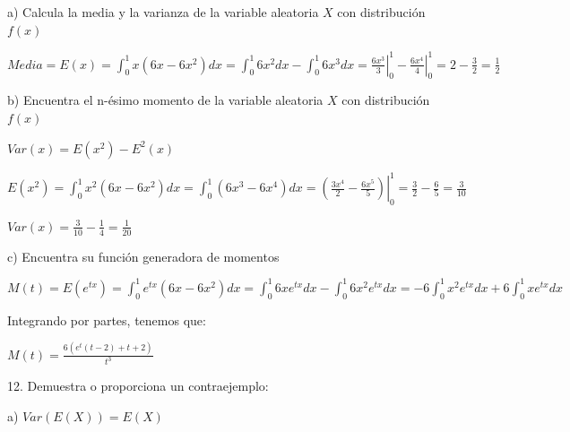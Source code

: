 \documentclass{article}
\begin{document}
        a) Calcula la media y la varianza de la variable aleatoria $X$ 
        con distribución $f(x)$\vspace{.1cm}

        \vspace{.1cm}

        $Media=E(x)=\displaystyle\int_{0}^{1}x(6x-6x^2)dx = 
        \int_{0}^{1}6x^2dx-\int_{0}^{1}6x^3dx = \left. \frac{6x^3}{3} \right |_{0}^{1}
         - \left. \frac{6x^4}{4} \right |_{0}^{1} = 2 - \frac{3}{2} = \frac{1}{2}$\vspace{.1cm}

        b) Encuentra el n-ésimo momento de la variable aleatoria $X$ 
        con distribución $f(x)$\vspace{.1cm}

        \vspace{.1cm}

        $Var(x) = E(x^2) - E^2(x)$\vspace{.1cm}

        $E(x^2) = \displaystyle\int_{0}^{1}x^2(6x-6x^2)dx = \int_{0}^{1}(6x^3-6x^4)dx = 
        \left .(\frac{3x^4}{2} - \frac{6x^5}{5})\right |_{0}^{1} 
        = \frac{3}{2} - \frac{6}{5} = \frac{3}{10}$
        \vspace{.1cm}

        $Var(x) = \frac{3}{10} - \frac{1}{4} = \frac{1}{20}$\vspace{.1cm}

        c) Encuentra su función generadora de momentos\vspace{.1cm}

        \vspace{.1cm}

        $M(t) = E(e^{tx}) = \int_{0}^{1}e^{tx}(6x-6x^2)dx 
        = \int_{0}^{1}6xe^{tx}dx - \int_{0}^{1}6x^2e^{tx}dx =
        -6\int_{0}^{1}x^2e^{tx}dx + 6\int_{0}^{1}xe^{tx}dx$
        
        Integrando por partes, tenemos que: \vspace{.1cm}

        $M(t) = \frac{6(e^t(t-2)+t+2)}{t^3}$\vspace{.3cm}

        12. Demuestra o proporciona un contraejemplo: \vspace{.1cm}

        a) $Var(E(X)) = E(X)$\vspace{.1cm}
\end{document}
